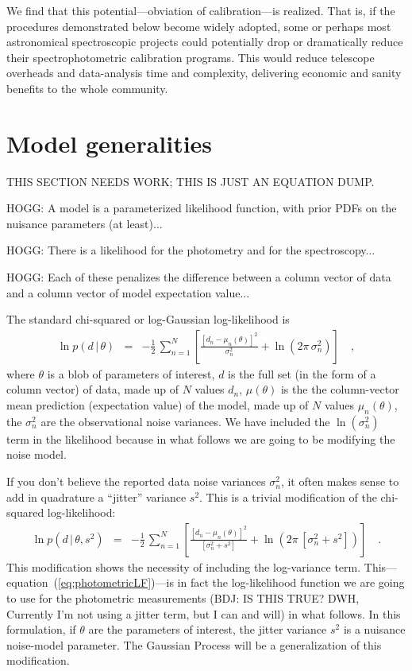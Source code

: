 \documentclass[12pt, letterpaper, preprint]{aastex}
\newcommand{\given}{\,|\,}
\begin{document}
We find that this potential---obviation of calibration---is realized.
That is, if the procedures demonstrated below become widely adopted,
some or perhaps most astronomical spectroscopic projects could
potentially drop or dramatically reduce their spectrophotometric
calibration programs.
This would reduce telescope overheads and data-analysis time and
complexity, delivering economic and sanity benefits to the whole
community.

\section{Model generalities}

THIS SECTION NEEDS WORK; THIS IS JUST AN EQUATION DUMP.

HOGG: A model is a parameterized likelihood function, with prior PDFs on the nuisance parameters (at least)...

HOGG: There is a likelihood for the photometry and for the spectroscopy...

HOGG: Each of these penalizes the difference between a column vector of data and a column vector of model expectation value...

The standard chi-squared or log-Gaussian log-likelihood is
\begin{eqnarray}
\ln p(d\given\theta) &=& -\frac{1}{2}\,\sum_{n=1}^N \left[\frac{[d_n - \mu_n(\theta)]^2}{\sigma_n^2} + \ln(2\pi\,\sigma_n^2) \right]
\quad ,
\end{eqnarray}
where $\theta$ is a blob of parameters of interest,
$d$ is the full set (in the form of a column vector) of data,
made up of $N$ values $d_n$,
$\mu(\theta)$ is the the column-vector mean prediction (expectation value) of the model,
made up of $N$ values $\mu_n(\theta)$,
the $\sigma_n^2$ are the observational noise variances.
We have included the $\ln(\sigma_n^2)$ term in the likelihood because
in what follows we are going to be modifying the noise model.

If you don't believe the reported data noise variances $\sigma_n^2$,
it often makes sense to add in quadrature a ``jitter'' variance $s^2$.
This is a trivial modification of the chi-squared log-likelihood:
\begin{eqnarray}\label{eq:photometricLF}
\ln p(d\given\theta,s^2) &=& -\frac{1}{2}\,\sum_{n=1}^N \left[\frac{[d_n - \mu_n(\theta)]^2}{[\sigma_n^2 + s^2]} + \ln(2\pi\,[\sigma_n^2 + s^2]) \right]
\quad .
\end{eqnarray}
This modification shows the necessity of including the log-variance
term.
This---equation~(\ref{eq:photometricLF})---is in fact the log-likelihood
function we are going to use for the photometric measurements (BDJ: IS
THIS TRUE?  DWH, Currently I'm not using a jitter term, but I can and will) in what follows.
In this formulation, if $\theta$ are the parameters of interest, the
jitter variance $s^2$ is a nuisance noise-model parameter.
The Gaussian Process will be a generalization of this modification.
\end{document}
